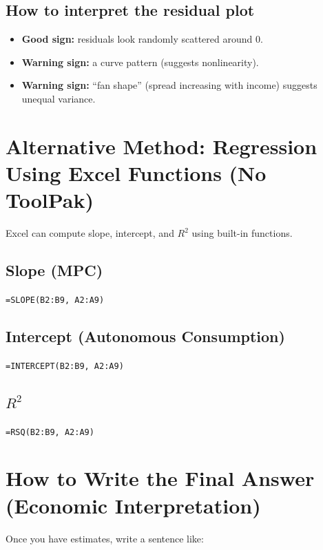 \documentclass[11pt]{article}
\begin{document}
\subsection*{How to interpret the residual plot}
\begin{itemize}
  \item \textbf{Good sign:} residuals look randomly scattered around 0.
  \item \textbf{Warning sign:} a curve pattern (suggests nonlinearity).
  \item \textbf{Warning sign:} ``fan shape'' (spread increasing with income) suggests unequal variance.
\end{itemize}

\section*{Alternative Method: Regression Using Excel Functions (No ToolPak)}
Excel can compute slope, intercept, and $R^2$ using built-in functions.

\subsection*{Slope (MPC)}
\begin{tcolorbox}[colback=gray!5, colframe=black!40, title=Excel Function: SLOPE]
\texttt{=SLOPE(B2:B9, A2:A9)}
\end{tcolorbox}

\subsection*{Intercept (Autonomous Consumption)}
\begin{tcolorbox}[colback=gray!5, colframe=black!40, title=Excel Function: INTERCEPT]
\texttt{=INTERCEPT(B2:B9, A2:A9)}
\end{tcolorbox}

\subsection*{$R^2$}
\begin{tcolorbox}[colback=gray!5, colframe=black!40, title=Excel Function: RSQ]
\texttt{=RSQ(B2:B9, A2:A9)}
\end{tcolorbox}

\section*{How to Write the Final Answer (Economic Interpretation)}
Once you have estimates, write a sentence like:
\end{document}
